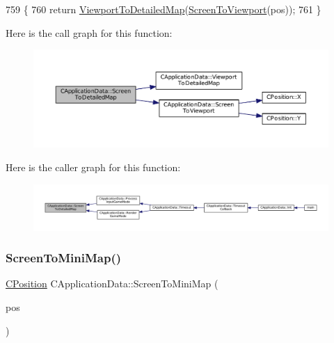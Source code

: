 \begin{DoxyCode}
759                                                                    \{
760     \textcolor{keywordflow}{return} \hyperlink{classCApplicationData_a2871f1b0855d14ed77db1abd83585d64}{ViewportToDetailedMap}(\hyperlink{classCApplicationData_aebd3ae4cfd74962413024f1649233f08}{ScreenToViewport}(pos));
761 \}
\end{DoxyCode}
Here is the call graph for this function\+:\nopagebreak
\begin{figure}[H]
\begin{center}
\leavevmode
\includegraphics[width=350pt]{classCApplicationData_a5c8b0ebf35fddb89b22f035544c32222_cgraph}
\end{center}
\end{figure}
Here is the caller graph for this function\+:\nopagebreak
\begin{figure}[H]
\begin{center}
\leavevmode
\includegraphics[width=350pt]{classCApplicationData_a5c8b0ebf35fddb89b22f035544c32222_icgraph}
\end{center}
\end{figure}
\hypertarget{classCApplicationData_a61dfd0d1f56382b3a8f21add40e1f74a}{}\label{classCApplicationData_a61dfd0d1f56382b3a8f21add40e1f74a} 
\subsubsection{\texorpdfstring{Screen\+To\+Mini\+Map()}{ScreenToMiniMap()}}
{\footnotesize\ttfamily \hyperlink{classCPosition}{C\+Position} C\+Application\+Data\+::\+Screen\+To\+Mini\+Map (\begin{DoxyParamCaption}\item[{const \hyperlink{classCPosition}{C\+Position} \&}]{pos }\end{DoxyParamCaption})\hspace{0.3cm}{\ttfamily [protected]}}




